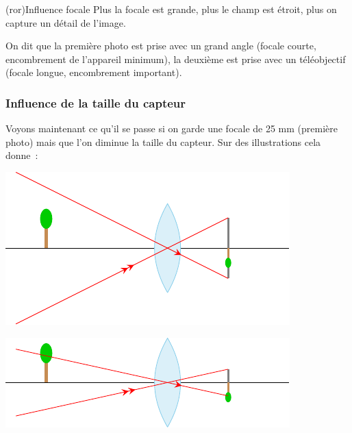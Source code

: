 \documentclass[../../main/main.tex]{subfiles}
\begin{document}
\begin{tcb}[cnt](ror){Influence focale}
	Plus la focale est grande, plus le champ est étroit, plus on capture un détail
	de l'image.
\end{tcb}

On dit que la première photo est prise avec un grand angle (focale courte,
encombrement de l'appareil minimum), la deuxième est prise avec un téléobjectif
(focale longue, encombrement important).

\subsubsection{Influence de la taille du capteur}

Voyons maintenant ce qu'il se passe si on garde une focale de 25 mm (première
photo) mais que l'on diminue la taille du capteur. Sur des illustrations cela
donne~:

\begin{minipage}{0.49\linewidth}
	\begin{center}
		\includegraphics[scale=1]{taille_capt-a} \\
	\end{center}
\end{minipage}
\begin{minipage}{0.49\linewidth}
	\begin{center}
		\includegraphics[scale=1]{taille_capt-b} \\
	\end{center}
\end{minipage}
\end{document}
